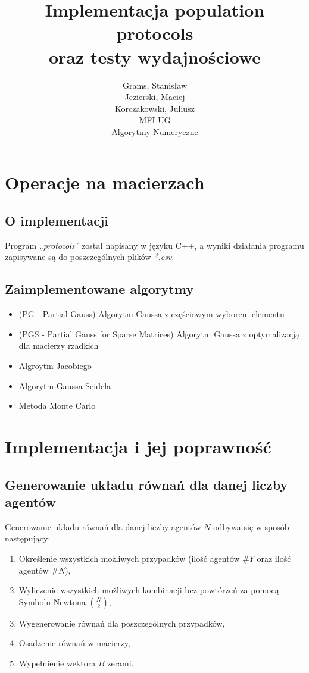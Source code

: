 \documentclass[10pt]{article}
\begin{document}
\title{Implementacja population protocols\\oraz testy wydajnościowe}
\author{Grams, Stanisław\\Jezierski, Maciej\\Korczakowski, Juliusz\\ MFI UG\\Algorytmy Numeryczne}

\maketitle
\section {Operacje na macierzach}
\subsection{O implementacji}
Program \textit{„protocols”} został napisany w języku C++, a wyniki działania programu zapisywane są do poszczególnych plików \textit{*.csv}.
\subsection{Zaimplementowane algorytmy}
\begin{itemize}
	\item (PG - Partial Gauss) Algorytm Gaussa z częściowym wyborem elementu
	\item (PGS - Partial Gauss for Sparse Matrices) Algorytm Gaussa z optymalizacją dla macierzy rzadkich
	\item Algroytm Jacobiego
	\item Algorytm Gaussa-Seidela
	\item Metoda Monte Carlo
\end{itemize}

\section{Implementacja i jej poprawność}
\subsection{Generowanie układu równań dla danej liczby agentów}
Generowanie układu równań dla danej liczby agentów $N$ odbywa się w sposób następujący:
\begin{enumerate}
	\item Określenie wszystkich możliwych przypadków (ilość agentów $\#Y$ oraz ilość agentów $\#N$),
	\item Wyliczenie wszystkich możliwych kombinacji bez powtórzeń za pomocą Symbolu Newtona ${{N} \choose {2}}$,
	\item Wygenerowanie równań dla poszczególnych przypadków,
	\item Osadzenie równań w macierzy,
	\item Wypełnienie wektora $B$ zerami.
\end{enumerate}
\end{document}
